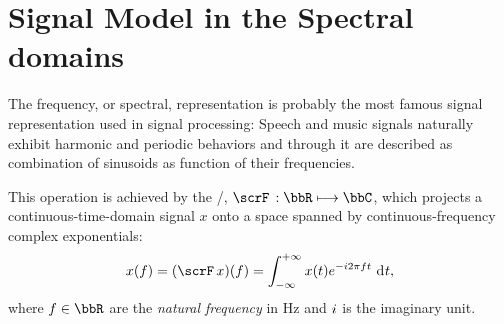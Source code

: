 
\section{Signal Model in the Spectral domains}\label{sec:processing:domains}
The frequency, or spectral, representation is probably the most famous signal representation used in signal processing:
Speech and music signals naturally exhibit harmonic and periodic behaviors and
through it are described as combination of sinusoids as function of their frequencies.

This operation is achieved by the \FTdef/, $\fourierTrans{}:\bbR\kmapsto\bbC$, which projects a continuous-time-domain signal $x$ onto a space spanned by continuous-frequency complex exponentials:
\begin{equation}\label{eq:processing:ft}
    x(f) = (\fourierTrans{x})(f) =
        \int_{-\infty}^{+\infty}
        x(t)
        \cste^{-\csti 2 \pi f t}
        \,\kdiff{t}
    ,
\end{equation}
where $f \in \bbR$ are the \textit{natural frequency} in $\si{\Hz}$ and ${i}$ is the imaginary unit.

